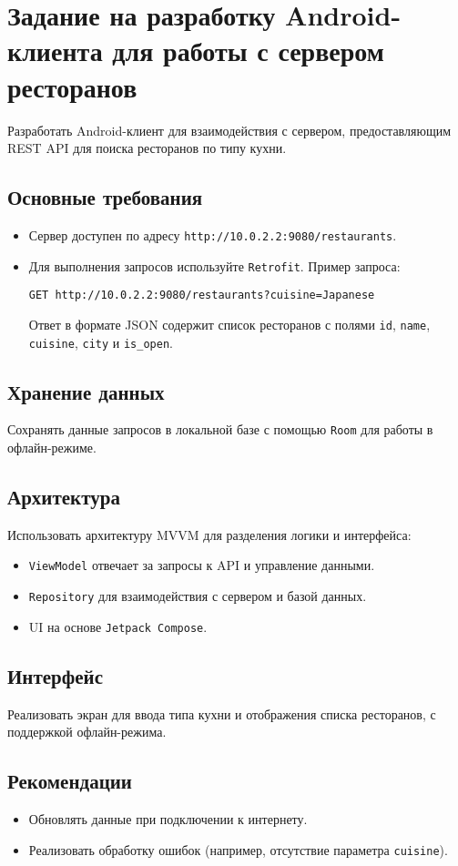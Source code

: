 \section{Задание на разработку Android-клиента для работы с сервером ресторанов}

Разработать Android-клиент для взаимодействия с сервером, предоставляющим REST API для поиска ресторанов по типу кухни. 

\subsection{Основные требования}
\begin{itemize}
    \item Сервер доступен по адресу \texttt{http://10.0.2.2:9080/restaurants}.
    \item Для выполнения запросов используйте \texttt{Retrofit}. Пример запроса:
\begin{verbatim}
GET http://10.0.2.2:9080/restaurants?cuisine=Japanese
\end{verbatim}
Ответ в формате JSON содержит список ресторанов с полями \texttt{id}, \texttt{name}, \texttt{cuisine}, \texttt{city} и \texttt{is\_open}.
\end{itemize}

\subsection{Хранение данных}
Сохранять данные запросов в локальной базе с помощью \texttt{Room} для работы в офлайн-режиме.

\subsection{Архитектура}
Использовать архитектуру MVVM для разделения логики и интерфейса:
\begin{itemize}
    \item \texttt{ViewModel} отвечает за запросы к API и управление данными.
    \item \texttt{Repository} для взаимодействия с сервером и базой данных.
    \item UI на основе \texttt{Jetpack Compose}.
\end{itemize}

\subsection{Интерфейс}
Реализовать экран для ввода типа кухни и отображения списка ресторанов, с поддержкой офлайн-режима.

\subsection{Рекомендации}
\begin{itemize}
    \item Обновлять данные при подключении к интернету.
    \item Реализовать обработку ошибок (например, отсутствие параметра \texttt{cuisine}).
\end{itemize}
